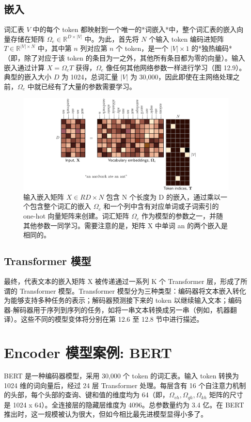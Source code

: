 \subsection{嵌入}
词汇表 \(V\) 中的每个 token 都映射到一个唯一的*词嵌入*中，整个词汇表的嵌入向量存储在矩阵 \(\Omega_e \in \mathbb{R}^{D \times |V|}\) 中。为此，首先将 \(N\) 个输入 token 编码进矩阵 \(T \in \mathbb{R}^{|V| \times N}\) 中，其中第 \(n\) 列对应第 \(n\) 个 token，是一个 \(|V| \times 1\) 的*独热编码*（即，除了对应于该 token 的条目为一之外，其他所有条目都为零的向量）。输入嵌入通过计算 \(X = \Omega_e T\) 获得，\(\Omega_e\) 像任何其他网络参数一样进行学习（图 12.9）。典型的嵌入大小 \(D\) 为 1024，总词汇量 \(|V|\) 为 30,000，因此即使在主网络处理之前，\(\Omega_e\) 中就已经有了大量的参数需要学习。

\begin{figure}[ht!]
\centering
\includegraphics[width=0.7\linewidth]{png/chapter12/TransformerVocabulary.png}
\caption{输入嵌入矩阵 \(X \in RD×N\) 包含 N 个长度为 D 的嵌入，通过乘以一个包含整个词汇的嵌入 \(\Omega_e\) 和一个列中含有对应单词或子词索引的 one-hot 向量矩阵来创建。词汇矩阵 \(\Omega_e\) 作为模型的参数之一，并随其他参数一同学习。需要注意的是，矩阵 X 中单词 an 的两个嵌入是相同的。}
\end{figure}


\subsection{Transformer 模型}
最终，代表文本的嵌入矩阵 X 被传递通过一系列 K 个 Transformer 层，形成了所谓的 Transformer 模型。Transformer 模型分为三种类型：编码器将文本嵌入转化为能够支持多种任务的表示；解码器预测接下来的 token 以继续输入文本；编码器-解码器用于序列到序列的任务，如将一串文本转换成另一串（例如，机器翻译）。这些不同的模型变体将分别在第 12.6 至 12.8 节中进行描述。


\section{Encoder 模型案例: BERT}
BERT 是一种编码器模型，采用 30,000 个 token 的词汇表。输入 token 转换为 1024 维的词向量后，经过 24 层 Transformer 处理。每层含有 16 个自注意力机制的头部，每个头部的查询、键和值的维度均为 64（即，\(\Omega_{vh}, \Omega_{qh}, \Omega_{kh}\) 矩阵的尺寸是 1024 x 64）。全连接层的隐藏层维度为 4096。总参数量约为 3.4 亿。在 BERT 推出时，这一规模被认为很大，但如今相比最先进模型显得小多了。

